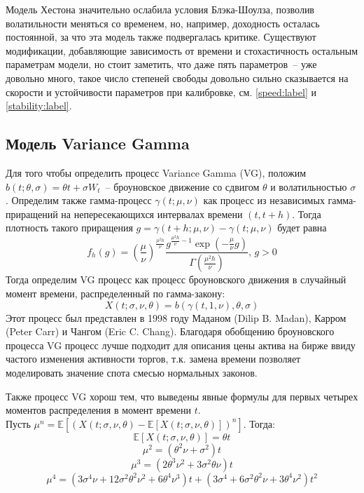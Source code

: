 \documentclass[oneside, final, 12pt, a4paper]{article}
\begin{document}
Модель Хестона значительно ослабила условия Блэка-Шоулза, позволив волатильности меняться со временем, но, например, доходность осталась постоянной, за что эта модель также подвергалась критике. Существуют модификации, добавляющие зависимость от времени и стохастичность остальным параметрам модели, но стоит заметить, что даже пять параметров~-- уже довольно много, такое число степеней свободы довольно сильно сказывается на скорости и устойчивости параметров при калибровке, см. \ref{speed:label} и \ref{stability:label}.

\newpage
\subsection{Модель Variance Gamma}
Для того чтобы определить процесс Variance Gamma (VG), положим \( b(t; \theta, \sigma) = \theta t + \sigma W_t \)~-- броуновское движение со сдвигом $\theta$ и волатильностью $\sigma$. Определим также гамма-процесс $\gamma(t; \mu, \nu)$ как процесс из независимых гамма-приращений на непересекающихся интервалах времени $(t, t + h)$. Тогда плотность такого приращения $g = \gamma(t+h; \mu, \nu) - \gamma(t; \mu, \nu)$ будет равна \[ f_h(g) = \left(\frac{\mu}{\nu}\right)^{\frac{\mu^2h} {\nu} } \frac{g^{\frac{\mu^2h}{\nu} - 1} \exp{\left(-\frac{\mu}{\nu}g\right)}}{\Gamma\left( \frac{\mu^2h}{\nu} \right)}, \,g > 0 \] Тогда определим VG процесс как процесс броуновского движения в случайный момент времени, распределенный по гамма-закону: \[ X(t; \sigma, \nu, \theta) = b(\gamma(t, 1, \nu), \theta, \sigma) \] Этот процесс был представлен в 1998 году Маданом (Dilip B. Madan), Карром (Peter Carr) и Чангом (Eric C. Chang). Благодаря обобщению броуновского процесса VG процесс лучше подходит для описания цены актива на бирже ввиду частого изменения активности торгов, т.к. замена времени позволяет моделировать значение спота смесью нормальных законов. \par
Также процесс VG хорош тем, что выведены\cite[стр. 85]{VG:paper} явные формулы для первых четырех моментов распределения в момент времени $t$. \\
Пусть \( \mu^n = \mathbb{E}\left[ (X(t; \sigma, \nu, \theta) - \mathbb{E}[X(t; \sigma, \nu, \theta)])^n \right] \). Тогда:
\[ \mathbb{E}[X(t; \sigma, \nu, \theta)] = \theta t \]
\[ \mu^2 = (\theta^2 \nu + \sigma^2)t \]
\[ \mu^3 = (2 \theta^3 \nu^2 + 3 \sigma^2 \theta \nu)t \]
\[ \mu^4 = (3 \sigma^4 \nu + 12 \sigma^2 \theta^2 \nu^2 + 6 \theta^4 \nu^3)t + 
(3 \sigma^4 + 6 \sigma^2 \theta^2 \nu + 3 \theta^4 \nu^2)t^2 \]
\label{VG:params}
\end{document}
